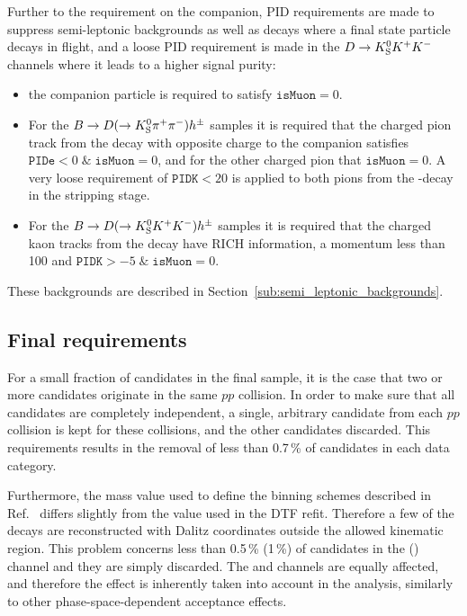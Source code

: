 Further to the requirement on the companion, PID requirements are made to suppress semi-leptonic backgrounds as well as decays where a final state particle decays in flight, and a loose PID requirement is made in the ${D}\rightarrow{\ensuremath{{K}^0_{\mathrm{S}}}}{\ensuremath{{K}^+}}{\ensuremath{{K}^-}}$ channels where it leads to a higher signal purity:
\begin{itemize}
    \item the companion particle is required to satisfy $\texttt{isMuon}=0$.
    \item For the ${B}\rightarrow{\ensuremath{D}}(\rightarrow{\ensuremath{{K}^0_{\mathrm{S}}}}{\ensuremath{{\pi}^+}}{\ensuremath{{\pi}^-}})h^{\pm}$ samples it is required that the charged pion track from the \D decay with opposite charge to the companion satisfies ${\texttt{PIDe} < 0 \;\&\; \texttt{isMuon}=0}$, and for the other charged pion that ${\texttt{isMuon}=0}$. A very loose requirement of $\texttt{PIDK} < 20$ is applied to both pions from the \D-decay in the stripping stage.
    \item For the ${B}\rightarrow{\ensuremath{D}}(\rightarrow{\ensuremath{{K}^0_{\mathrm{S}}}}{\ensuremath{{K}^+}}{\ensuremath{{K}^-}})h^{\pm}$ samples it is required that the charged kaon tracks from the \D decay have RICH information, a momentum less than 100 \gevc and ${\texttt{PIDK} > -5 \;\&\; \texttt{isMuon}=0}$.
\end{itemize}
These backgrounds are described in Section~\ref{sub:semi_leptonic_backgrounds}.



\subsection{Final requirements} %
\label{sub:final_requirements}

For a small fraction of candidates in the final sample, it is the case that two or more candidates originate in the same $pp$ collision. In order to make sure that all candidates are completely independent, a single, arbitrary candidate from each $pp$ collision is kept for these collisions, and the other candidates discarded. This requirements results in the removal of less than 0.7\,\% of candidates in each data category.

Furthermore, the \D mass value used to define the binning schemes described in Ref.~\cite{CLEOCISI} differs slightly from the value used in the DTF refit. Therefore a few of the decays are reconstructed with Dalitz coordinates outside the allowed kinematic region. This problem concerns less than 0.5\,\% (1\,\%) of candidates in the \DtoKspp (\DtoKskk) channel and they are simply discarded. The \BtoDK and \BtoDpi channels are equally affected, and therefore the effect is inherently taken into account in the analysis, similarly to other phase-space-dependent acceptance effects.

